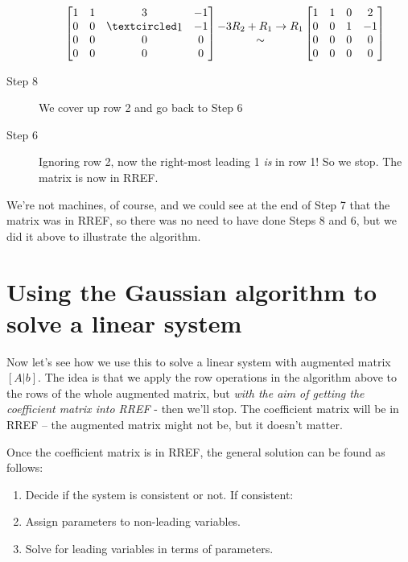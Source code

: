 \begin{myexample}
\begin{description}
$$\mat{ 
1 & 1 & 3 & -1\\ 
0 & 0 & \pivot & -1 \\
0 & 0 & 0 & 0 \\
0 & 0 & 0 & 0}
\begin{matrix}  -3R_2+ R_1\to R_1  \\\sim \end{matrix} 
\mat{ 
1 & 1 & 0 & 2\\ 
0 & 0 & 1 & -1 \\
0 & 0 & 0 & 0 \\
0 & 0 & 0 & 0}$$

\item[Step 8] We cover up row 2 and go back to Step 6
\item[Step 6] Ignoring row 2, now the right-most leading 1 {\it is} in row 1! So we stop. The matrix is now in RREF.

\end{description}

We're not machines, of course, and we could see at the end of Step 7 that the matrix was in RREF, so there was no need to have done Steps 8 and 6, but we did it above to illustrate the algorithm. 

\end{myexample}


\section{Using the Gaussian algorithm to solve a linear system}


Now let's see how we use this to solve a linear system with augmented matrix $[A|b]$. The idea is that
we apply the row operations in the algorithm above to the rows of the whole augmented matrix, but {\it with the aim of getting the coefficient matrix into RREF} - then we'll stop.  The coefficient matrix  will be in RREF -- the augmented matrix might not be, but it doesn't matter.



Once the coefficient matrix is  in RREF, the general solution can be found as follows:
\begin{enumerate}
\item Decide if the system is consistent or not.  If consistent:
\item Assign parameters to non-leading variables.
\item Solve for leading variables in terms of parameters.
\end{enumerate}

